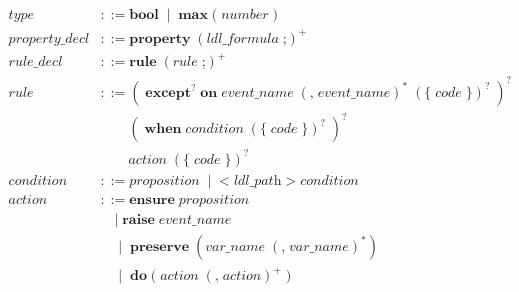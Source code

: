 \documentclass[preview=true]{standalone}
\newcommand{\token}[1]{\textbf{#1}}
\begin{document}
\begin{table}[t]
\begin{align*}
  \textit{type} &::=
    \token{bool}\;
    \mid\; \token{max}\; \texttt{(}\; \textit{number}\; \texttt{)}
  \\
  \textit{property\_decl} &::=
  \token{property}\;
  \left(\textit{ldl\_formula}\; \texttt{;}\right)^+
  \\
  \textit{rule\_decl} &::= \token{rule}\;
  \left(\textit{rule}\; \texttt{;}\right)^+
  \\
  \textit{rule} &::=
  \left(\;
  \token{except}^?\; \token{on}\; \textit{event\_name}\;
  \left(\texttt{,}\; \textit{event\_name}\right)^\ast\;
  \left( \token{\{}\; \textit{code}\; \token{\}} \right)^?\;
  \right)^?\;
  \\&\qquad
  \left(\;
  \token{when}\; \textit{condition}\;
  \left( \token{\{}\; \textit{code}\; \token{\}} \right)^?\;
  \right)^?
  \\&\qquad
  \textit{action}\;
  \left( \token{\{}\; \textit{code}\; \token{\}} \right)^?\;
  \\
  \textit{condition} &::= \textit{proposition}\;
  \mid\;
  \texttt{<}\; \textit{ldl\_path}\; \texttt{>}\; \textit{condition}
  \\
  \textit{action} &::=
  \token{ensure}\; \textit{proposition}
  \\&\quad
  \mid\;
  \token{raise}\; \textit{event\_name}\;
  \\&\quad
  \mid\;
  \token{preserve}\; (\textit{var\_name}\; (\texttt{,}\; \textit{var\_name})^\ast)
  \\&\quad
  \mid\;
  \token{do}\;
    \texttt{(}\;
    \textit{action}\; \left(\texttt{,}\; \textit{action}\right)^+\;
    \texttt{)}
\end{align*}
\end{table}
\smallskip
\end{document}
